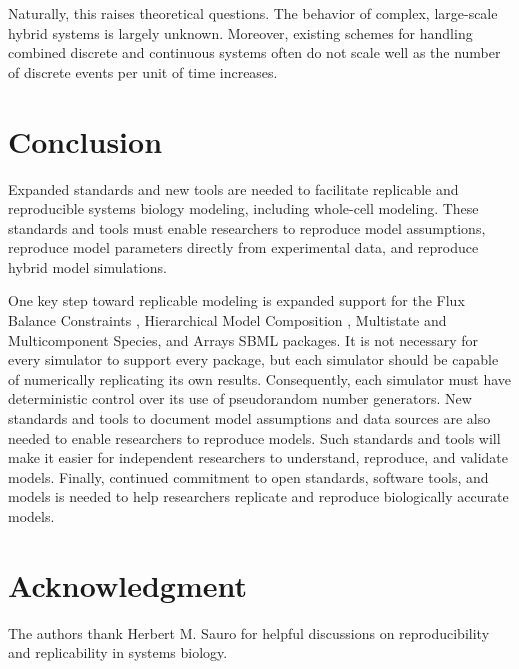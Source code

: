 \documentclass[journal,transmag,twoside]{IEEEtran}
\begin{document}
Naturally, this raises theoretical questions. The behavior of complex, large-scale hybrid systems is largely unknown. Moreover, existing schemes for handling combined discrete and continuous systems often do not scale well as the number of discrete events per unit of time increases.

\section{Conclusion}

Expanded standards and new tools are needed to facilitate replicable and reproducible systems biology modeling, including whole-cell modeling.
These standards and tools must enable researchers to reproduce model assumptions, reproduce model parameters
directly from experimental data, and reproduce hybrid model simulations. 

One key step toward replicable modeling is expanded support for the 
Flux Balance Constraints \cite{olivier2015fbc}, Hierarchical Model Composition \cite{smith2015sbml}, Multistate and Multicomponent
Species, and Arrays \cite{watanabe2016efficient} SBML packages. It is not necessary for every simulator
to support every package, but each simulator should be capable of numerically replicating its own results.
Consequently, each simulator must have deterministic control over its use of pseudorandom number generators.
New standards and tools to document model assumptions and data sources are also needed to enable researchers to reproduce models.
Such standards and tools will make it easier for independent researchers to understand, reproduce, and validate models. 
Finally, continued commitment to open standards, software tools, and models is needed to help researchers replicate and reproduce biologically accurate models.

\section{Acknowledgment}

The authors thank Herbert M. Sauro for helpful discussions
on reproducibility and replicability in systems biology.

\ifCLASSOPTIONcaptionsoff
  \newpage
\fi



\end{document}
